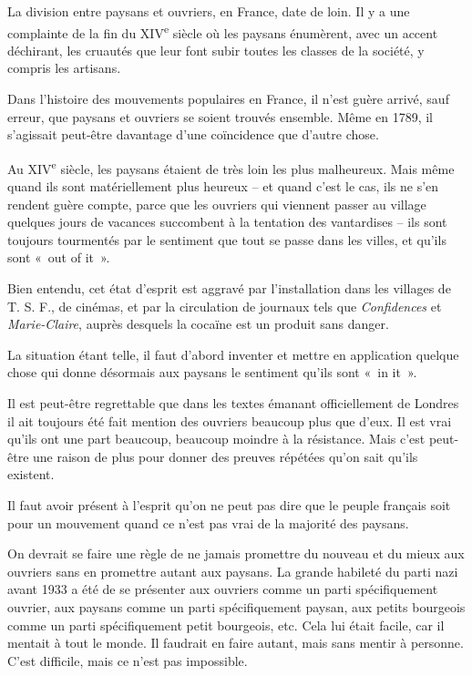 \documentclass[french,twoside]{book} %
\begin{document}
La division entre paysans et ouvriers, en France, date de loin. Il y a une complainte de la fin du XIV\textsuperscript{e} siècle où les paysans énumèrent, avec un accent déchirant, les cruautés que leur font subir toutes les classes de la société, y compris les artisans.\par
Dans l'histoire des mouvements populaires en France, il n'est guère arrivé, sauf erreur, que paysans et ouvriers se soient trouvés ensemble. Même en 1789, il s'agissait peut-être davantage d'une coïncidence que d'autre chose.\par
Au XIV\textsuperscript{e} siècle, les paysans étaient de très loin les plus malheureux. Mais même quand ils sont matériellement plus heureux – et quand c'est le cas, ils ne s'en rendent guère compte, parce que les ouvriers qui viennent passer au village quelques jours de vacances succombent à la tentation des vantardises – ils sont toujours tourmentés par le sentiment que tout se passe dans les villes, et qu'ils sont « out of it ».\par
Bien entendu, cet état d'esprit est aggravé par l'installation dans les villages de T. S. F., de cinémas, et par la circulation de journaux tels que {\itshape Confidences} et {\itshape Marie-Claire}, auprès desquels la cocaïne est un produit sans danger.\par
La situation étant telle, il faut d'abord inventer et mettre en application quelque chose qui donne désormais aux paysans le sentiment qu'ils sont « in it ».\par
Il est peut-être regrettable que dans les textes émanant officiellement de Londres il ait toujours été fait mention des ouvriers beaucoup plus que d'eux. Il est vrai qu'ils ont une part beaucoup, beaucoup moindre à la résistance. Mais c'est peut-être une raison de plus pour donner des preuves répétées qu'on sait qu'ils existent.\par
Il faut avoir présent à l'esprit qu'on ne peut pas dire que le peuple français soit pour un mouvement quand ce n'est pas vrai de la majorité des paysans.\par
On devrait se faire une règle de ne jamais promettre du nouveau et du mieux aux ouvriers sans en promettre autant aux paysans. La grande habileté du parti nazi avant 1933 a été de se présenter aux ouvriers comme un parti spécifiquement ouvrier, aux paysans comme un parti spécifiquement paysan, aux petits bourgeois comme un parti spécifiquement petit bourgeois, etc. Cela lui était facile, car il mentait à tout le monde. Il faudrait en faire autant, mais sans mentir à personne. C'est difficile, mais ce n'est pas impossible.\par
\end{document}
